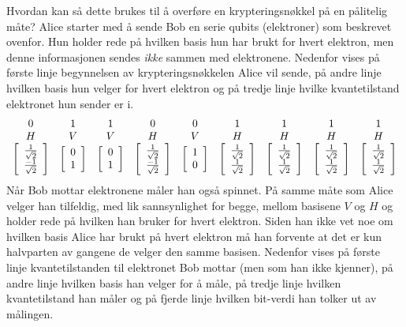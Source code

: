 Hvordan kan så dette brukes til å overføre en krypteringsnøkkel på en pålitelig måte? Alice starter med å sende Bob en serie qubits (elektroner) som beskrevet ovenfor. Hun holder rede på hvilken basis hun har brukt for hvert elektron, men denne informasjonen sendes \emph{ikke} sammen med elektronene. Nedenfor vises på første linje begynnelsen av krypteringsnøkkelen Alice vil sende, på andre linje hvilken basis hun velger for hvert elektron og på tredje linje hvilke kvantetilstand elektronet hun sender er i.
\begin{displaymath}
\begin{array}{ccccccccc}
	0&1&1&0&0&1&1&1&1 \\
	H&V&V&H&V&H&H&H&H \\
	\left[\begin{array}{c}\frac{1}{\sqrt{2}}\\ \frac{-1}{\sqrt{2}}\end{array}\right] &
	\left[\begin{array}{c}0\\1\end{array}\right] &
	\left[\begin{array}{c}0\\1\end{array}\right] &
	\left[\begin{array}{c}\frac{1}{\sqrt{2}}\\ \frac{-1}{\sqrt{2}}\end{array}\right] &
	\left[\begin{array}{c}1\\0\end{array}\right] &
	\left[\begin{array}{c}\frac{1}{\sqrt{2}}\\ \frac{1}{\sqrt{2}}\end{array}\right] &
	\left[\begin{array}{c}\frac{1}{\sqrt{2}}\\ \frac{1}{\sqrt{2}}\end{array}\right] &
	\left[\begin{array}{c}\frac{1}{\sqrt{2}}\\ \frac{1}{\sqrt{2}}\end{array}\right] &
	\left[\begin{array}{c}\frac{1}{\sqrt{2}}\\ \frac{1}{\sqrt{2}}\end{array}\right] 
\end{array}
\end{displaymath}
Når Bob mottar elektronene måler han også spinnet. På samme måte som Alice velger han tilfeldig, med lik sannsynlighet for begge, mellom basisene $V$ og $H$ og holder rede på hvilken han bruker for hvert elektron. Siden han ikke vet noe om hvilken basis Alice har brukt på hvert elektron må han forvente at det er kun halvparten av gangene de velger den samme basisen. Nedenfor vises på første linje kvantetilstanden til elektronet Bob mottar (men som han ikke kjenner), på andre linje hvilken basis han velger for å måle, på tredje linje hvilken kvantetilstand han måler og på fjerde linje hvilken bit-verdi han tolker ut av målingen.
